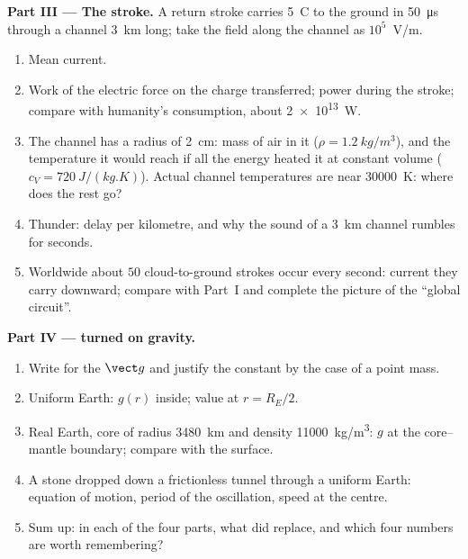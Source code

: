 \begin{problem}
\medskip
\noindent\textbf{Part III --- The stroke.}
A return stroke carries \qty{5}{C} to the ground in \qty{50}{\micro s}
through a channel \qty{3}{km} long; take the field along the channel
as $10^5$~V/m.
\begin{enumerate}[resume]
  \item Mean current.
  \item Work of the electric force on the charge transferred; power
        during the stroke; compare with humanity's 
        consumption, about \qty{2e13}{W}.
  \item The channel has a radius of \qty{2}{cm}: mass of air in it
        ($\rho = \qty{1.2}{kg/m^3}$), and the temperature it would reach if
        all the energy heated it at constant volume ($c_V =
        \qty{720}{J/(kg.K)}$). Actual channel temperatures are near
        \qty{30000}{K}: where does the rest go?
  \item Thunder: delay per kilometre, and why the sound of a
        \qty{3}{km} channel rumbles for seconds.
  \item Worldwide about $50$ cloud-to-ground strokes occur every second:
        current they carry downward; compare with Part~I and complete the
        picture of the ``global circuit''.
\end{enumerate}

\medskip
\noindent\textbf{Part IV ---  turned on gravity.}
\begin{enumerate}[resume]
  \item Write  for the  $\vect g$ and
        justify the constant by the case of a point mass.
  \item Uniform Earth: $g(r)$ inside; value at $r = R_E/2$.
  \item Real Earth, core of radius \qty{3480}{km} and density
        \qty{11000}{kg/m^3}: $g$ at the core--mantle boundary; compare with
        the surface.
  \item A stone dropped down a frictionless tunnel through a uniform
        Earth: equation of motion, period of the oscillation, speed at
        the centre.
  \item Sum up: in each of the four parts, what did  replace,
        and which four numbers are worth remembering?
\end{enumerate}
\end{problem}
